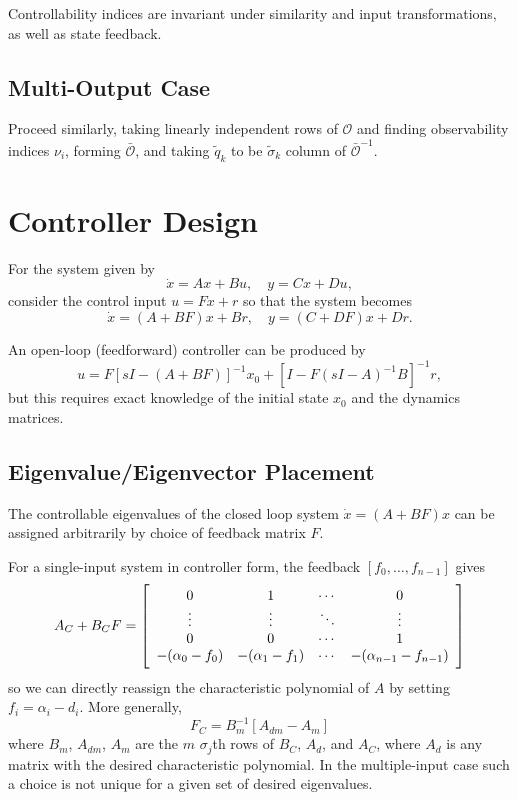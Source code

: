 \documentclass{report}
\begin{document}
Controllability indices are invariant under similarity and input
transformations, as well as state feedback.

\subsection{Multi-Output Case}
Proceed similarly, taking linearly independent rows of $\mathcal{O}$
and finding observability indices $\nu_i$, forming $\bar{\mathcal{O}}$,
and taking $\tilde{q}_k$ to be
$\tilde{\sigma}_k$ column of $\bar{\mathcal{O}}^{-1}$.

\section{Controller Design}
For the system given by
$$
\dot{x} = Ax + Bu, \quad
y = Cx + Du,
$$
consider the control input $u = Fx + r$
so that the system becomes
$$
\dot{x} = (A + BF)x + Br, \quad
y = (C + DF) x + Dr.
$$

An open-loop (feedforward) controller can be produced by
$$
u = F[sI - (A + BF)]^{-1} x_0 + [I - F(sI - A)^{-1} B]^{-1} r,
$$
but this requires exact knowledge of the initial state $x_0$ and the
dynamics matrices.

\subsection{Eigenvalue/Eigenvector Placement}
The controllable eigenvalues of the closed loop system
$\dot{x} = (A + BF)x$ can be assigned arbitrarily by choice of
feedback matrix $F$.

For a single-input system in controller form, the feedback
$[f_0, \dots, f_{n-1}]$ gives
$$
A_C + B_C F =
\left[\begin{array}{c c c c}
   0                & 1                 & \cdots & 0      \\
   \vdots           & \vdots            & \ddots & \vdots \\
   0                & 0                 & \cdots & 1      \\
  -(\alpha_0 - f_0) &  -(\alpha_1 - f_1) & \cdots & -(\alpha_{n-1} - f_{n-1})
\end{array}\right]
$$
so we can directly reassign the characteristic polynomial of $A$ by
setting $f_i = \alpha_i - d_i$. More generally,
$$
F_C = B_m^{-1} [ A_{dm} - A_m ]
$$
where $B_m$, $A_{dm}$, $A_m$ are the $m$ $\sigma_j$th rows of $B_C$,
$A_d$, and $A_C$, where $A_d$ is any matrix with the desired
characteristic polynomial. In the multiple-input case such a choice is
not unique for a given set of desired eigenvalues.
\end{document}
